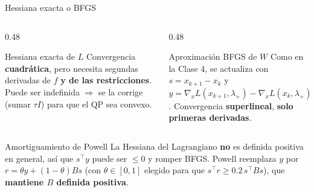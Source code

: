 \documentclass[aspectratio=169]{beamer}
\newcommand{\grad}{\nabla}
\begin{document}
\begin{frame}{Hessiana exacta o BFGS}
  \begin{columns}[T]
    \begin{column}{0.48\textwidth}
      \begin{block}{Hessiana exacta de $L$}
        Convergencia \textbf{cuadrática}, pero necesita segundas derivadas de $f$ \textbf{y de las restricciones}. Puede ser indefinida $\Rightarrow$ se la corrige (sumar $\tau I$) para que el QP sea convexo.
      \end{block}
    \end{column}
    \begin{column}{0.48\textwidth}
      \begin{block}{Aproximación BFGS de $W$}
        Como en la Clase 4, se actualiza con $s=x_{k+1}-x_k$ y $y=\grad_xL(x_{k+1},\lambda_{+})-\grad_xL(x_k,\lambda_{+})$. Convergencia \textbf{superlineal}, \textbf{solo primeras derivadas}.
      \end{block}
    \end{column}
  \end{columns}
  \vspace{0.2cm}
  \begin{alertblock}{Amortiguamiento de Powell}
    La Hessiana del Lagrangiano \textbf{no} es definida positiva en general, así que $s^\top y$ puede ser $\le0$ y romper BFGS. Powell reemplaza $y$ por $r=\theta y+(1-\theta)Bs$ (con $\theta\in[0,1]$ elegido para que $s^\top r\ge0.2\,s^\top Bs$), que \textbf{mantiene $B$ definida positiva}.
  \end{alertblock}
\end{frame}
\end{document}
